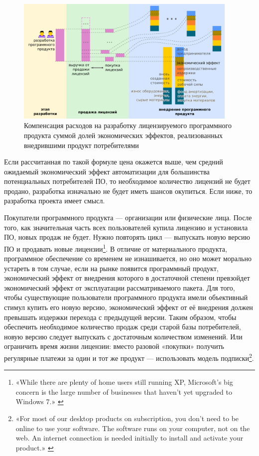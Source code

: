 \documentclass{article}
\begin{document}
\begin{figure}[ht]
    \centering
    \includegraphics[width=0.95\textwidth]{model-eco-effect-license}
    \caption{Компенсация расходов на разработку лицензируемого программного продукта суммой долей экономических эффектов, реализованных внедрившими продукт потребителями}
    \label{fig:model_eco_effect_license}
\end{figure}

Если рассчитанная по такой формуле цена окажется выше, чем средний ожидаемый экономический эффект автоматизации для большинства потенциальных потребителей ПО, то необходимое количество лицензий не будет продано, разработка изначально не будет иметь шансов окупиться. Если ниже, то разработка проекта имеет смысл.

Покупатели программного продукта — организации или физические лица. После того, как значительная часть всех пользователей купила лицензию и установила ПО, новых продаж не будет. Нужно повторять цикл — выпускать новую версию ПО и продавать новые лицензии\footnote{«While there are plenty of home users still running XP, Microsoft’s big concern is the large number of businesses that haven’t yet upgraded to Windows 7.» \cite{windowsXPLegacy}}. В отличие от материального продукта, программное обеспечение со временем не изнашивается, но оно может морально устареть в том случае, если на рынке появится программный продукт, экономический эффект от внедрения которого в достаточной степени превзойдет экономический эффект от эксплуатации рассматриваемого пакета. Для того, чтобы существующие пользователи программного продукта имели объективный стимул купить его новую версию, экономический эффект от её внедрения должен превышать издержки перехода с предыдущей версии. Таким образом, чтобы обеспечить необходимое количество продаж среди старой базы потребителей, новую версию следует выпускать с достаточным количеством изменений. Или ограничить время жизни лицензии: вместо разовой «покупки» получить регулярные платежи за один и тот же продукт — использовать модель подписки\footnote{«For most of our desktop products on subscription, you don't need to be online to use your software. The software runs on your computer, not on the web. An internet connection is needed initially to install and activate your product.» \cite{autodeskSubscription}}.
\end{document}
